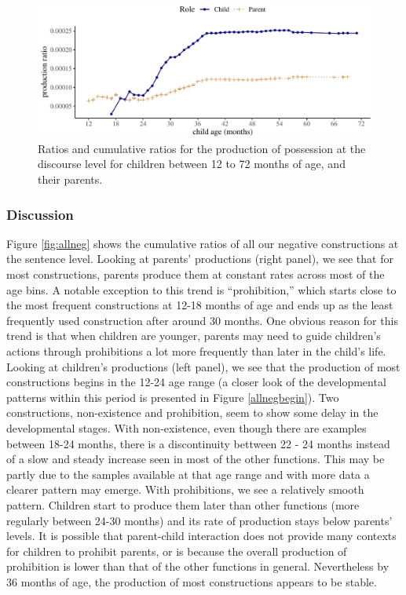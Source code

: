 \documentclass[
  english,
  man,floatsintext]{apa6}
\begin{document}
\begin{figure}[H]

{\centering \includegraphics{neg_construction_article_files/figure-latex/possessiondiscourse-1} 

}

\caption{Ratios and cumulative ratios for the production of possession at the discourse level for children between 12 to 72 months of age, and their parents.}\label{fig:possessiondiscourse}
\end{figure}

\hypertarget{discussion}{%
\subsubsection{Discussion}\label{discussion}}

Figure \ref{fig:allneg} shows the cumulative ratios of all our negative constructions at the sentence level. Looking at parents' productions (right panel), we see that for most constructions, parents produce them at constant rates across most of the age bins. A notable exception to this trend is ``prohibition,'' which starts close to the most frequent constructions at 12-18 months of age and ends up as the least frequently used construction after around 30 months. One obvious reason for this trend is that when children are younger, parents may need to guide children's actions through prohibitions a lot more frequently than later in the child's life. Looking at children's productions (left panel), we see that the production of most constructions begins in the 12-24 age range (a closer look of the developmental patterns within this period is presented in Figure \ref{allnegbegin}). Two constructions, non-existence and prohibition, seem to show some delay in the developmental stages. With non-existence, even though there are examples between 18-24 months, there is a discontinuity bettween 22 - 24 months instead of a slow and steady increase seen in most of the other functions. This may be partly due to the samples available at that age range and with more data a clearer pattern may emerge. With prohibitions, we see a relatively smooth pattern. Children start to produce them later than other functions (more regularly between 24-30 months) and its rate of production stays below parents' levels. It is possible that parent-child interaction does not provide many contexts for children to prohibit parents, or is because the overall production of prohibition is lower than that of the other functions in general. Nevertheless by 36 months of age, the production of most constructions appears to be stable.
\end{document}
